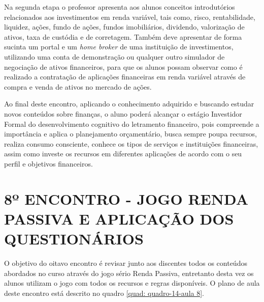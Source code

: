 Na segunda etapa o professor apresenta aos alunos conceitos introdutórios relacionados aos investimentos em renda variável, tais como, risco, rentabilidade, liquidez, ações, fundo de ações, fundos imobiliários, dividendo, valorização de ativos, taxa de custódia e de corretagem. Também deve apresentar de forma sucinta um portal e um \textit{home broker} de uma instituição de investimentos, utilizando uma conta de demonstração ou qualquer outro simulador de negociação de ativos financeiros, para que os alunos possam observar como é realizado a contratação de aplicações financeiras em renda variável através de compra e venda de ativos no mercado de ações.

Ao final deste encontro, aplicando o conhecimento adquirido e buscando estudar novos conteúdos sobre finanças, o aluno poderá alcançar o estágio Investidor Formal do desenvolvimento cognitivo do letramento financeiro, pois compreende a importância e aplica o planejamento orçamentário, busca sempre poupa recursos, realiza consumo consciente, conhece os tipos de serviços e instituições financeiras, assim como investe os recursos em diferentes aplicações de acordo com o seu perfil e objetivos financeiros.

\section{8º ENCONTRO - JOGO RENDA PASSIVA E APLICAÇÃO DOS QUESTIONÁRIOS}
O objetivo do oitavo encontro é revisar junto aos discentes todos os conteúdos abordados no curso através do jogo sério Renda Passiva, entretanto desta vez os alunos utilizam o jogo com todos os recursos e regras disponíveis. O plano de aula deste encontro está descrito no quadro \ref{quad: quadro-14-aula 8}.

